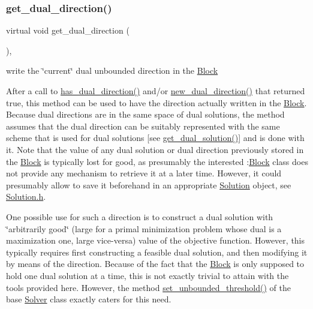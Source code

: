 \subsubsection{\texorpdfstring{get\+\_\+dual\+\_\+direction()}{get\_dual\_direction()}}
{\footnotesize\ttfamily virtual void get\+\_\+dual\+\_\+direction (\begin{DoxyParamCaption}\item[{void}]{ }\end{DoxyParamCaption})\hspace{0.3cm}{\ttfamily [inline]}, {\ttfamily [virtual]}}



write the \char`\"{}current\char`\"{} dual unbounded direction in the \mbox{\hyperlink{class_s_m_spp__di__unipi__it_1_1_block}{Block}} 

After a call to \mbox{\hyperlink{class_s_m_spp__di__unipi__it_1_1_c_d_a_solver_a4247feaa72c255f28a2a71b5e634b60a}{has\+\_\+dual\+\_\+direction()}} and/or \mbox{\hyperlink{class_s_m_spp__di__unipi__it_1_1_c_d_a_solver_ad83925e362d49bbe570a881791e45ea0}{new\+\_\+dual\+\_\+direction()}} that returned true, this method can be used to have the direction actually written in the \mbox{\hyperlink{class_s_m_spp__di__unipi__it_1_1_block}{Block}}. Because dual directions are in the same space of dual solutions, the method assumes that the dual direction can be suitably represented with the same scheme that is used for dual solutions \mbox{[}see \mbox{\hyperlink{class_s_m_spp__di__unipi__it_1_1_c_d_a_solver_a347d37171494bf83416a48b279b94d5a}{get\+\_\+dual\+\_\+solution()}}\mbox{]} and is done with it. Note that the value of any dual solution or dual direction previously stored in the \mbox{\hyperlink{class_s_m_spp__di__unipi__it_1_1_block}{Block}} is typically lost for good, as presumably the interested \+:\mbox{\hyperlink{class_s_m_spp__di__unipi__it_1_1_block}{Block}} class does not provide any mechanism to retrieve it at a later time. However, it could presumably allow to save it beforehand in an appropriate \mbox{\hyperlink{class_s_m_spp__di__unipi__it_1_1_solution}{Solution}} object, see \mbox{\hyperlink{_solution_8h}{Solution.\+h}}.

One possible use for such a direction is to construct a dual solution with \char`\"{}arbitrarily good\char`\"{} (large for a primal minimization problem whose dual is a maximization one, large vice-\/versa) value of the objective function. However, this typically requires first constructing a feasible dual solution, and then modifying it by means of the direction. Because of the fact that the \mbox{\hyperlink{class_s_m_spp__di__unipi__it_1_1_block}{Block}} is only supposed to hold one dual solution at a time, this is not exactly trivial to attain with the tools provided here. However, the method \mbox{\hyperlink{class_s_m_spp__di__unipi__it_1_1_solver_ae1717d1363782e086aa797e7437c0352}{set\+\_\+unbounded\+\_\+threshold()}} of the base \mbox{\hyperlink{class_s_m_spp__di__unipi__it_1_1_solver}{Solver}} class exactly caters for this need.

